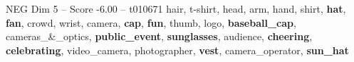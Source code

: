 \begin{textsample}{NEG Dim 5 – Score -6.00 – t010671}  \label{ex:f5_neg_018}
hair, t-shirt, head, arm, hand, shirt, \textbf{hat}, \textbf{fan}, crowd, wrist, camera, \textbf{cap}, \textbf{fun}, thumb, logo, \textbf{baseball\_cap}, cameras\_\&\_optics, \textbf{public\_event}, \textbf{sunglasses}, audience, \textbf{cheering}, \textbf{celebrating}, video\_camera, photographer, \textbf{vest}, camera\_operator, \textbf{sun\_hat}

\end{textsample}
